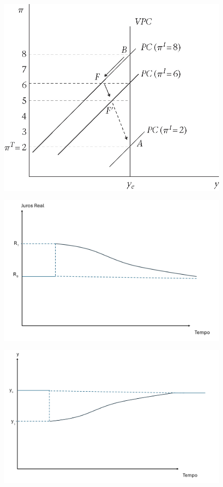 \documentclass[a4paper,12pt]{article}[abntex2]
\begin{document}
\begin{figure}[H]
    \centering
    \includegraphics[width=0.7\linewidth]{Imagens/a10i1.png}
\end{figure}

\begin{figure}[H]
    \centering
    \includegraphics[width=0.7\linewidth]{Imagens/a10i2.png}
\end{figure}

\begin{figure}[H]
    \centering
    \includegraphics[width=0.7\linewidth]{Imagens/a10i3.png}
\end{figure}
\end{document}
